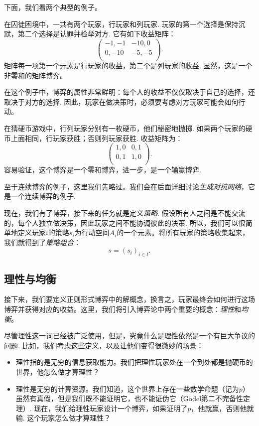 下面，我们看两个典型的例子。

\begin{example}[囚徒困境]\label{ex:prisoner}
在囚徒困境中，一共有两个玩家，行玩家和列玩家. 玩家的第一个选择是保持沉默，第二个选择是认罪并检举对方. 它有如下收益矩阵：
\[
\begin{pmatrix}
-1,-1&-10,0\\
0,-10&-5,-5\\
\end{pmatrix}.
\]
矩阵每一项第一个元素是行玩家的收益，第二个是列玩家的收益. 显然，这是一个非零和的矩阵博弈。

在这个例子中，博弈的属性非常鲜明：每个人的收益不仅仅取决于自己的选择，还取决于对方的选择. 因此，玩家在做决策时，必须要考虑对方玩家可能会如何行动。
\end{example}

\begin{example}[猜硬币游戏]
在猜硬币游戏中，行列玩家分别有一枚硬币，他们秘密地抛掷. 如果两个玩家的硬币上面相同，行玩家获胜；否则列玩家获胜. 收益矩阵为：
    \[
    \begin{pmatrix}
    1,0&0,1\\
    0,1&1,0\\
    \end{pmatrix}.
    \]
容易验证，这个博弈是一个零和博弈，进一步，是一个输赢博弈.
\end{example}

至于连续博弈的例子，这里我们先略过。我们会在后面详细讨论\emph{生成对抗网络}，它是一个连续博弈的例子.

现在，我们有了博弈，接下来的任务就是定义\emph{策略}. 假设所有人之间是不能交流的，每个人独立做决策，因此玩家之间不能协调彼此的决策. 所以，我们可以很简单地定义玩家$i$的策略$s_i$为行动空间$A_i$的一个元素。将所有玩家的策略收集起来，我们就得到了\emph{策略组合}：
\[
s=(s_i)_{i\in I}.
\]

\subsection{理性与均衡}

接下来，我们要定义正则形式博弈中的解概念，换言之，玩家最终会如何进行这场博弈并获得对应的收益。这里，我们将引入博弈论中两个重要的概念：\emph{理性}和\emph{均衡}。

尽管理性这一词已经被广泛使用，但是，究竟什么是理性依然是一个有巨大争议的问题. 比如，我们考虑这些定义，以及让他们变得很微妙的场景：
\begin{itemize}
    \item 理性指的是无穷的信息获取能力。我们把理性玩家处在一个到处都是抛硬币的世界，他怎么做才算理性？
    \item 理性是无穷的计算资源。我们知道，这个世界上存在一些数学命题（记为$p$）虽然有真假，但是我们既不能证明它，也不能证伪它（Gödel第二不完备性定理）. 现在，我们给理性玩家设计一个博弈，如果证明了$p$，他就赢，否则他就输. 这个玩家怎么做才算理性？
\end{itemize}

